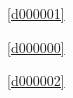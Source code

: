 ﻿



\noindent\treeindexnumbernameone\ \ref{d000001}\dotfill\pageref{d000001}%

\noindent\treeindexnumbernameone\ \ref{d000000}\dotfill\pageref{d000000}%

\noindent\treeindexnumbernameone\ \ref{d000002}\dotfill\pageref{d000002}%









